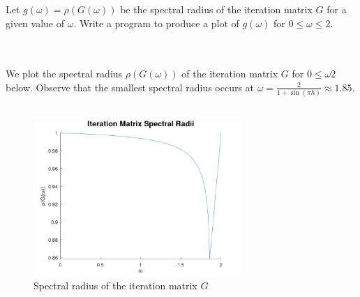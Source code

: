 Let $g(\omega) = \rho(G(\omega))$ be the spectral radius of the iteration matrix $G$ for a given value of $\omega$.
Write a program to produce a plot of $g(\omega)$ for $0 \le \omega \le 2$.

\begin{solution}\ \\\\
    We plot the spectral radius $\rho(G(\omega))$ of the iteration matrix $G$ for $0 \le \omega 2$ below. Observe that
    the smallest spectral radius occurs at $\omega = \frac{2}{1 + \sin{(\pi h)}} \approx 1.85$. \\\\

    \begin{figure}[h]
        \centering
        \includegraphics[width=0.7\textwidth]{problem_1c_spectral_radius.png}
        \caption{Spectral radius of the iteration matrix $G$}
    \end{figure}
    \ \\
\end{solution}